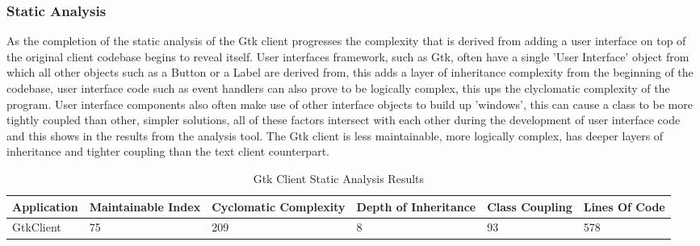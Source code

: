 \documentclass{article}
\begin{document}
\subsubsection{Static Analysis}
As the completion of the static analysis of the Gtk client progresses the complexity that is derived from adding a user interface on top of the original client codebase begins to reveal itself. User interfaces framework, such as Gtk, often have a single 'User Interface' object from which all other objects such as a Button or a Label are derived from, this adds a layer of inheritance complexity from the beginning of the codebase, user interface code such as event handlers can also prove to be logically complex, this ups the clyclomatic complexity of the program. User interface components also often make use of other interface objects to build up 'windows', this can cause a class to be more tightly coupled than other, simpler solutions, all of these factors intersect with each other during the development of user interface code and this shows in the results from the analysis tool. The Gtk client is less maintainable, more logically complex, has deeper layers of inheritance and tighter coupling than the text client counterpart.
\begin{table}[H]
	\centering
	\caption{Gtk Client Static Analysis Results}
	\label{my-label}
	\begin{tabularx}{\textwidth}{|X|X|X|X|X|X|}
		\hline
		\textbf{Application} & \textbf{Maintainable Index} & \textbf{Cyclomatic Complexity} & \textbf{Depth of Inheritance} & \textbf{Class Coupling} & \textbf{Lines Of Code} \\ \hline
		GtkClient & 75 &     209      &      8     &     93      &      578     \\ \hline
	\end{tabularx}
\end{table}
\end{document}
